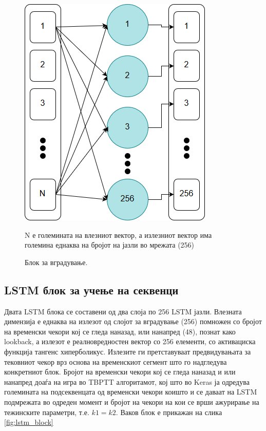\begin{figure}[H]
	\centering
    \includegraphics[scale=0.5]{images/embedding_block.png}
	\caption{Блок за вградување.}
	N е големината на влезниот вектор, а излезниот вектор има големина еднаква на бројот на јазли во мрежата (256)
	\label{fig:embedding}
\end{figure}

\subsection{LSTM блок за учење на секвенци}

Двата LSTM блока се составени од два слоја по 256 LSTM јазли. Влезната димензија е еднаква на излезот од слојот за вградување (256) помножен со бројот на временски чекори кој се гледа наназад, или нанапред (48), познат како lookback, а излезот е реалновредностен вектор со 256 елементи, со активациска функција тангенс хиперболикус. Излезите ги претставуваат предвидувањата за тековниот чекор врз основа на временскиот сегмент што го надгледува конкретниот блок. Бројот на временски чекори кој се гледа наназад и или нанапред доаѓа на игра во TBPTT алгоритамот, кој што во Keras ја одредува големината на подсеквенцата од временски чекори коишто и се даваат на LSTM подмрежата во одреден момент и бројот на чекори на кои се врши ажурирање на тежинските параметри, т.е. $k1=k2$. 
Ваков блок е прикажан на слика \ref{fig:lstm_block}

